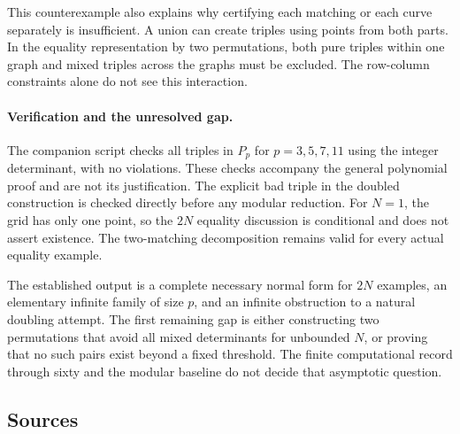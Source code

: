 \documentclass[11pt,a4paper]{article}
\begin{document}
This counterexample also explains why certifying each matching or each curve separately is insufficient. A union can create triples using points from both parts. In the equality representation by two permutations, both pure triples within one graph and mixed triples across the graphs must be excluded. The row-column constraints alone do not see this interaction.

\paragraph{Verification and the unresolved gap.}
The companion script checks all triples in $P_p$ for $p=3,5,7,11$ using the integer determinant, with no violations. These checks accompany the general polynomial proof and are not its justification. The explicit bad triple in the doubled construction is checked directly before any modular reduction. For $N=1$, the grid has only one point, so the $2N$ equality discussion is conditional and does not assert existence. The two-matching decomposition remains valid for every actual equality example.

The established output is a complete necessary normal form for $2N$ examples, an elementary infinite family of size $p$, and an infinite obstruction to a natural doubling attempt. The first remaining gap is either constructing two permutations that avoid all mixed determinants for unbounded $N$, or proving that no such pairs exist beyond a fixed threshold. The finite computational record through sixty and the modular baseline do not decide that asymptotic question.

\subsection{Sources}
\end{document}
